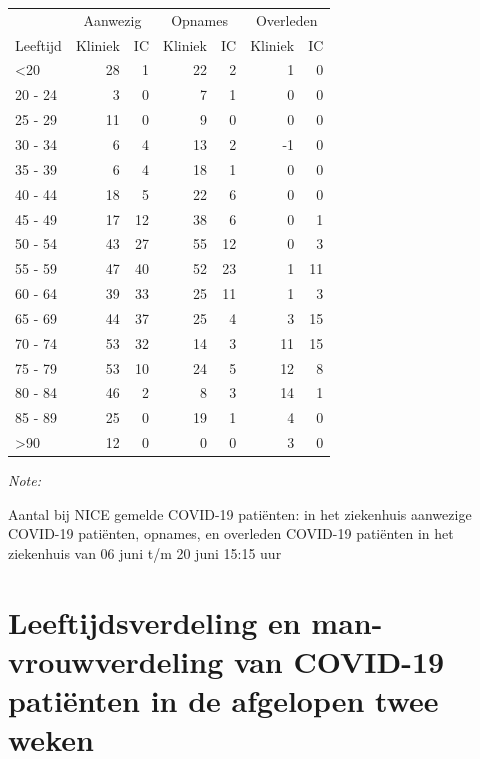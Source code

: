 \documentclass[
  english,
  man,floatsintext]{apa6}
\begin{document}
\begin{table}
\centering\begingroup\fontsize{10}{12}\selectfont

\begin{threeparttable}
\begin{tabular}{lrrrrrr}
\toprule
\multicolumn{1}{c}{ } & \multicolumn{2}{c}{Aanwezig} & \multicolumn{2}{c}{Opnames} & \multicolumn{2}{c}{Overleden} \\
\cmidrule(l{3pt}r{3pt}){2-3} \cmidrule(l{3pt}r{3pt}){4-5} \cmidrule(l{3pt}r{3pt}){6-7}
Leeftijd & Kliniek & IC & Kliniek & IC & Kliniek & IC\\
\midrule
<20 & 28 & 1 & 22 & 2 & 1 & 0\\
20 - 24 & 3 & 0 & 7 & 1 & 0 & 0\\
25 - 29 & 11 & 0 & 9 & 0 & 0 & 0\\
30 - 34 & 6 & 4 & 13 & 2 & -1 & 0\\
35 - 39 & 6 & 4 & 18 & 1 & 0 & 0\\
40 - 44 & 18 & 5 & 22 & 6 & 0 & 0\\
45 - 49 & 17 & 12 & 38 & 6 & 0 & 1\\
50 - 54 & 43 & 27 & 55 & 12 & 0 & 3\\
55 - 59 & 47 & 40 & 52 & 23 & 1 & 11\\
60 - 64 & 39 & 33 & 25 & 11 & 1 & 3\\
65 - 69 & 44 & 37 & 25 & 4 & 3 & 15\\
70 - 74 & 53 & 32 & 14 & 3 & 11 & 15\\
75 - 79 & 53 & 10 & 24 & 5 & 12 & 8\\
80 - 84 & 46 & 2 & 8 & 3 & 14 & 1\\
85 - 89 & 25 & 0 & 19 & 1 & 4 & 0\\
>90 & 12 & 0 & 0 & 0 & 3 & 0\\
\bottomrule
\end{tabular}
\begin{tablenotes}
\item \textit{Note: } 
\item Aantal bij NICE gemelde COVID-19 patiënten: in het ziekenhuis aanwezige COVID-19 patiënten, opnames, en overleden COVID-19 patiënten in het ziekenhuis van 06 juni t/m 20 juni 15:15 uur
\end{tablenotes}
\end{threeparttable}
\endgroup{}
\end{table}

\newpage

\hypertarget{leeftijdsverdeling-en-man-vrouwverdeling-van-covid-19-patiuxebnten-in-de-afgelopen-twee-weken}{%
\section{Leeftijdsverdeling en man-vrouwverdeling van COVID-19 patiënten in de afgelopen twee weken}\label{leeftijdsverdeling-en-man-vrouwverdeling-van-covid-19-patiuxebnten-in-de-afgelopen-twee-weken}}
\end{document}

